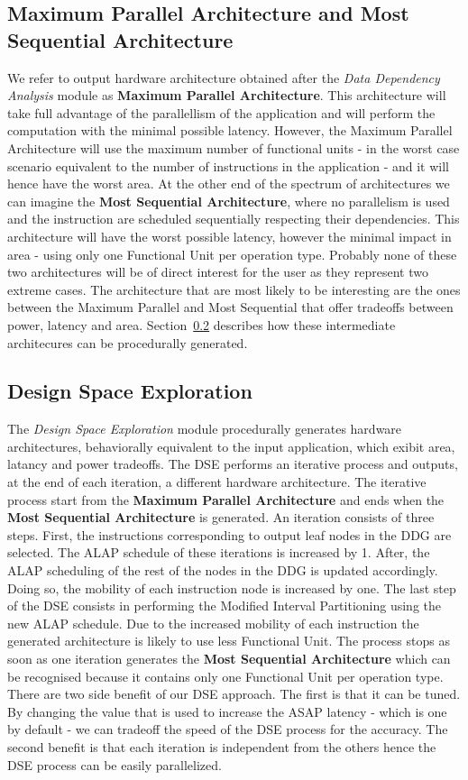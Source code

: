 \subsection{Maximum Parallel Architecture and Most Sequential Architecture}
We refer to output hardware architecture obtained after the \textit{Data Dependency Analysis} module as \textbf{Maximum Parallel Architecture}. This architecture will take full advantage of the parallellism of the application and will perform the computation with the minimal possible latency. However, the Maximum Parallel Architecture will use the maximum number of functional units - in the worst case scenario equivalent to the number of instructions in the application - and it will hence have the worst area.
At the other end of the spectrum of architectures we can imagine the \textbf{Most Sequential Architecture}, where no parallelism is used and the instruction are scheduled sequentially respecting their dependencies. This architecture will have the worst possible latency, however the minimal impact in area - using only one Functional Unit per operation type.
Probably none of these two architectures will be of direct interest for the user as they represent two extreme cases. The architecture that are most likely to be interesting are the ones between the Maximum Parallel and Most Sequential that offer tradeoffs between power, latency and area. Section~\ref{ssec:dse} describes how these intermediate architecures can be procedurally generated.

\subsection{Design Space Exploration}
\label{ssec:dse}
The \textit{Design Space Exploration} module procedurally generates hardware architectures, behaviorally equivalent to the input application, which exibit area, latancy and power tradeoffs. 
The DSE performs an iterative process and outputs, at the end of each iteration, a different hardware architecture. The iterative process start from the \textbf{Maximum Parallel Architecture} and ends when the \textbf{Most Sequential Architecture} is generated. 
An iteration consists of three steps. First, the instructions corresponding to output leaf nodes in the DDG are selected. The ALAP schedule of these iterations is increased by 1. After, the ALAP scheduling of the rest of the nodes in the DDG is updated accordingly. Doing so, the mobility of each instruction node is increased by one. The last step of the DSE consists in performing the Modified Interval Partitioning using the new ALAP schedule. Due to the increased mobility of each instruction the generated architecture is likely to use less Functional Unit.
The process stops as soon as one iteration generates the \textbf{Most Sequential Architecture} which can be recognised because it contains only one Functional Unit per operation type.
There are two side benefit of our DSE approach. The first is that it can be tuned. By changing the value that is used to increase the ASAP latency - which is one by default - we can tradeoff the speed of the DSE process for the accuracy. The second benefit is that each iteration is independent from the others hence the DSE process can be easily parallelized.


